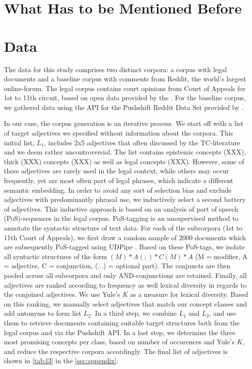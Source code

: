 \documentclass{article}
\begin{document}
\graphicspath{ {../../../output/03-results/plots/} }

\section{What Has to be Mentioned Before}
\label{sec:before}

\section{Data}

The data for this study comprises two distinct corpora: a corpus with legal documents and a baseline corpus with comments from Reddit, the world's largest online-forum. The legal corpus contains court opinions from Court of Appeals for 1st to 11th circuit, based on open data provided by the \citet{FreeLawProject2020}. For the baseline corpus, we gathered data using the API for the Pushshift Reddit Data Set provided by \citet{Baumgartner2020}. 

In our case, the corpus generation is an iterative process. We start off with a list of target adjectives we specified without information about the corpora. This initial list, $L_1$, includes 2x5 adjectives that often discussed by the TC-literature and we deem rather uncontroversial. The list contains epistemic concepts (XXX), thick (XXX) concepts (XXX) as well as legal concepts (XXX). However, some of these adjectives are rarely used in the legal context, while others may occur frequently, yet are most often part of legal phrases, which indicate a different semantic embedding. In order to avoid any sort of selection bias and exclude adjectives with predominantly phrasal use, we inductively select a second battery of adjectives. This inductive approach is based on an analysis of part of speech (PoS)-sequences in the legal corpus. PoS-tagging is an unsupervised method to annotate the syntactic structure of text data. For each of the subcorpora (1st to 11th Court of Appeals), we first draw a random sample of 2000 documents which are subsequently PoS-tagged using UDPipe \citep{Straka2017, Straka2020}. Based on these PoS-tags, we isolate all syntactic structures of the form $(M)*A(,)*C(M)*A$ (M = modifier, A = adjective, C = conjunction, (...) = optional part). The conjuncts are then pooled across all subcorpora and only AND-conjunctions are retained. Finally, all adjectives %
are ranked according to frequency as well lexical diversity in regards to the conjoined adjectives. We use Yule's \textit{K} \citep{Yule1944, Tweedie1998} as a measure for lexical diversity.  %
Based on this ranking, we manually select adjectives that match our concept classes and add antonyms to form list $L_2$. In a third step, we combine $L_1$ and $L_2$, and use them to retrieve documents containing suitable target structures both from the legal corpus and via the Pushshift API. In a last step, we determine the three most promising concepts per class, based on number of occurences and Yule's $K$, and reduce the respective corpora accordingly. The final list of adjectives is shown in \ref{tab:l3} in the \ref{sec:appendix}. 
\end{document}
